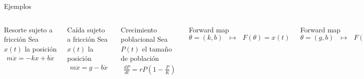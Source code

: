 \documentclass[10pt]{beamer}
\begin{document}
\begin{frame}{Ejemplos}
  \begin{columns}[T,onlytextwidth]

    
    \begin{alertblock}{Resorte sujeto a fricción}
      Sea $x(t)$ la posición
      \begin{align*}
        m\ddot{x} = -kx + b \dot{x}
      \end{align*}
    \end{alertblock}
    
    \begin{block}{Caída sujeto a fricción}
      Sea $x(t)$ la posición
      \begin{align*}
        m\ddot{x} = g - b \dot{x}
      \end{align*}
    \end{block}

      \begin{alertblock}{Crecimiento poblacional}
        Sea $P(t)$ el tamaño de población
        \begin{align*}
          \frac{dP}{dt} = r P \left(1 - \frac{P}{K}\right) 
        \end{align*}
      \end{alertblock}



      \begin{alertblock}{Forward map}
        $\theta = (k,b)  \:\:\: \mapsto \:\:\: F(\theta) = x(t)$
      \end{alertblock}
      
      \vspace*{1 cm}
      
      \begin{block}{Forward map}
        $\theta = (g,b)  \:\:\: \mapsto \:\:\: F(\theta) = x(t)$
      \end{block}

      \vspace*{1 cm}

      \begin{alertblock}{Forward map}
        $\theta = (r,K)  \:\:\: \mapsto \:\:\: F(\theta) = P(t)$
      \end{alertblock}

  \end{columns}
\end{frame}
\end{document}
